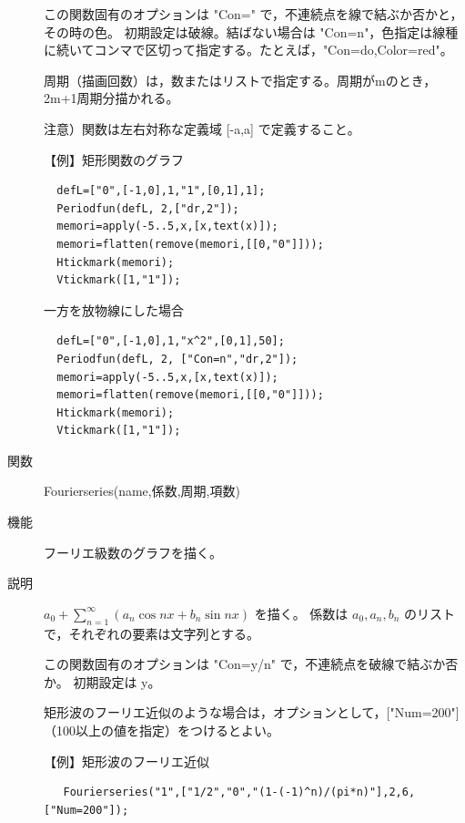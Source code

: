 \documentclass[papersize,a4paper,12pt,uplatex]{jsarticle}
\begin{document}
\begin{description}
この関数固有のオプションは "Con=" で，不連続点を線で結ぶか否かと，その時の色。
 初期設定は破線。結ばない場合は "Con=n"，色指定は線種に続いてコンマで区切って指定する。たとえば，"Con=do,Color=red"。

周期（描画回数）は，数またはリストで指定する。周期がmのとき，2m+1周期分描かれる。


注意）関数は左右対称な定義域 [-a,a] で定義すること。

\vspace{\baselineskip}
【例】矩形関数のグラフ

\begin{verbatim}
  defL=["0",[-1,0],1,"1",[0,1],1];
  Periodfun(defL, 2,["dr,2"]);
  memori=apply(-5..5,x,[x,text(x)]);
  memori=flatten(remove(memori,[[0,"0"]]));
  Htickmark(memori);
  Vtickmark([1,"1"]);
\end{verbatim}

\hspace{20mm}

\vspace{\baselineskip}
一方を放物線にした場合  
\begin{verbatim}
  defL=["0",[-1,0],1,"x^2",[0,1],50];
  Periodfun(defL, 2, ["Con=n","dr,2"]);
  memori=apply(-5..5,x,[x,text(x)]);
  memori=flatten(remove(memori,[[0,"0"]]));
  Htickmark(memori);
  Vtickmark([1,"1"]);
\end{verbatim}

\hspace{20mm}

\vspace{\baselineskip}
\hypertarget{fourierseries}{}
\item[関数]  Fourierseries(name,係数,周期,項数)
\item[機能]  フーリエ級数のグラフを描く。
\item[説明]  $a_0+\displaystyle{\sum _{n=1} ^{\infty}(a_n \cos nx + b_n \sin nx)}$ を描く。
係数は $a_0,a_n,b_n$ のリストで，それぞれの要素は文字列とする。

この関数固有のオプションは "Con=y/n" で，不連続点を破線で結ぶか否か。 初期設定は y。

矩形波のフーリエ近似のような場合は，オプションとして，["Num=200"]（100以上の値を指定）をつけるとよい。

\vspace{\baselineskip}
【例】矩形波のフーリエ近似
\begin{verbatim}
   Fourierseries("1",["1/2","0","(1-(-1)^n)/(pi*n)"],2,6,["Num=200"]);
\end{verbatim}


\end{description}
\end{document}

